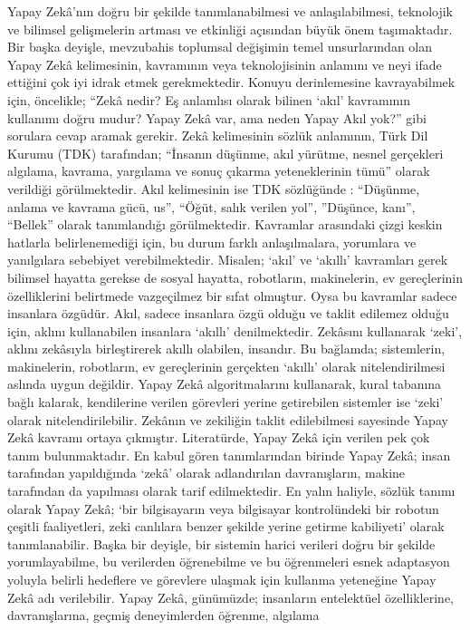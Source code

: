 \documentclass{article}
\begin{document}
\begin{multicols}{2}
Yapay Zekâ’nın doğru bir şekilde tanımlanabilmesi ve anlaşılabilmesi, teknolojik
ve bilimsel gelişmelerin artması ve etkinliği açısından büyük önem taşımaktadır.
Bir başka deyişle, mevzubahis toplumsal değişimin temel unsurlarından olan
Yapay Zekâ kelimesinin, kavramının veya teknolojisinin anlamını ve neyi ifade
ettiğini çok iyi idrak etmek gerekmektedir. Konuyu derinlemesine kavrayabilmek için, öncelikle; “Zekâ nedir? Eş anlamlısı olarak bilinen ‘akıl’ kavramının kullanımı doğru mudur? Yapay Zekâ var, ama neden Yapay Akıl yok?” gibi sorulara cevap
aramak gerekir. Zekâ kelimesinin sözlük anlamının, Türk Dil Kurumu (TDK) tarafından; “İnsanın düşünme, akıl yürütme, nesnel gerçekleri algılama, kavrama, yargılama ve sonuç çıkarma yeteneklerinin tümü” olarak verildiği görülmektedir. Akıl
kelimesinin ise TDK sözlüğünde : “Düşünme, anlama ve kavrama gücü, us”, “Öğüt,
salık verilen yol”, ”Düşünce, kanı”, “Bellek” olarak tanımlandığı görülmektedir.
Kavramlar arasındaki çizgi keskin hatlarla belirlenemediği için, bu durum farklı
anlaşılmalara, yorumlara ve yanılgılara sebebiyet verebilmektedir. Misalen; ‘akıl’
ve ‘akıllı’ kavramları gerek bilimsel hayatta gerekse de sosyal hayatta, robotların, makinelerin, ev gereçlerinin özelliklerini belirtmede vazgeçilmez bir sıfat
olmuştur. Oysa bu kavramlar sadece insanlara özgüdür. Akıl, sadece insanlara
özgü olduğu ve taklit edilemez olduğu için, aklını kullanabilen insanlara ‘akıllı’
denilmektedir. Zekâsını kullanarak ‘zeki’, aklını zekâsıyla birleştirerek akıllı olabilen, insandır. Bu bağlamda; sistemlerin, makinelerin, robotların, ev gereçlerinin gerçekten ‘akıllı’ olarak nitelendirilmesi aslında uygun değildir. Yapay Zekâ
algoritmalarını kullanarak, kural tabanına bağlı kalarak, kendilerine verilen görevleri yerine getirebilen sistemler ise ‘zeki’ olarak nitelendirilebilir. Zekânın ve
zekiliğin taklit edilebilmesi sayesinde Yapay Zekâ kavramı ortaya çıkmıştır. Literatürde, Yapay Zekâ için verilen pek çok tanım bulunmaktadır. En kabul gören
tanımlarından birinde Yapay Zekâ; insan tarafından yapıldığında ‘zekâ’ olarak
adlandırılan davranışların, makine tarafından da yapılması olarak tarif edilmektedir. En yalın haliyle, sözlük tanımı olarak Yapay Zekâ; ‘bir bilgisayarın veya bilgisayar kontrolündeki bir robotun çeşitli faaliyetleri, zeki canlılara benzer şekilde yerine getirme kabiliyeti’ olarak tanımlanabilir. Başka bir deyişle, bir sistemin harici verileri doğru bir şekilde yorumlayabilme, bu verilerden öğrenebilme ve bu öğrenmeleri
esnek adaptasyon yoluyla belirli hedeflere ve görevlere ulaşmak için kullanma yeteneğine Yapay Zekâ adı verilebilir. Yapay Zekâ, günümüzde; insanların entelektüel özelliklerine, davranışlarına, geçmiş deneyimlerden öğrenme, algılama

\end{multicols}
\end{document}
